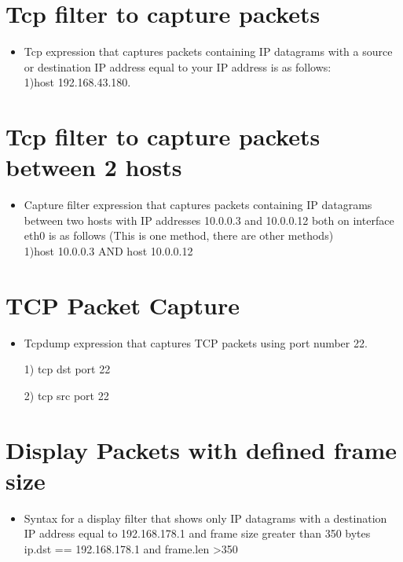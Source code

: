 \section{Tcp filter to capture packets}
\begin{itemize}
\item Tcp expression that captures packets containing IP datagrams with a source or destination IP address equal to your IP address is as follows:\\

1)host 192.168.43.180.\\

\end{itemize}
\section{Tcp filter to capture packets between 2 hosts}
\begin{itemize}
\item Capture filter expression that captures packets containing IP datagrams between two hosts with IP addresses 10.0.0.3 and 10.0.0.12 both on interface eth0 is as follows
(This is one method, there are other methods)
\\1)host 10.0.0.3 AND host 10.0.0.12
\end{itemize}
\section{TCP Packet Capture}
\begin{itemize}
\item Tcpdump expression that captures TCP packets using port number 22.

1) tcp dst port 22

2) tcp src port 22
\end{itemize}
\section{Display Packets with defined frame size}
\begin{itemize}
\item Syntax for a display filter that shows only IP datagrams with a destination IP address equal to 192.168.178.1 and frame size greater than 350 bytes
\\ip.dst == 192.168.178.1 and frame.len \textgreater 350
\end{itemize}